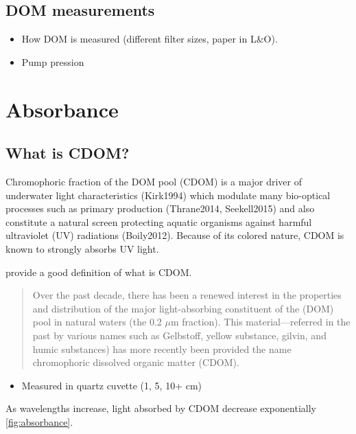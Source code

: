 \documentclass[]{book}
\providecommand{\tightlist}{%
  \setlength{\itemsep}{0pt}\setlength{\parskip}{0pt}}
\begin{document}
\section{DOM measurements}\label{dom-measurements}

\begin{itemize}
\tightlist
\item
  How DOM is measured (different filter sizes, paper in L\&O).
\item
  Pump pression
\end{itemize}

\chapter{Absorbance}\label{absorbance}

\section{What is CDOM?}\label{what-is-cdom}

Chromophoric fraction of the DOM pool (CDOM) is a major driver of
underwater light characteristics (Kirk1994) which modulate many
bio-optical processes such as primary production (Thrane2014,
Seekell2015) and also constitute a natural screen protecting aquatic
organisms against harmful ultraviolet (UV) radiations (Boily2012).
Because of its colored nature, CDOM is known to strongly absorbs UV
light.

\citet{Blough2002} provide a good definition of what is CDOM.

\begin{quote}
Over the past decade, there has been a renewed interest in the
properties and distribution of the major light-absorbing constituent of
the (DOM) pool in natural waters (the 0.2 \(μ\)m fraction). This
material---referred in the past by various names such as Gelbstoff,
yellow substance, gilvin, and humic substances) has more recently been
provided the name chromophoric dissolved organic matter (CDOM).
\end{quote}

\begin{itemize}
\tightlist
\item
  Measured in quartz cuvette (1, 5, 10+ cm)
\end{itemize}

As wavelengths increase, light absorbed by CDOM decrease exponentially
\ref{fig:absorbance}.
\end{document}
